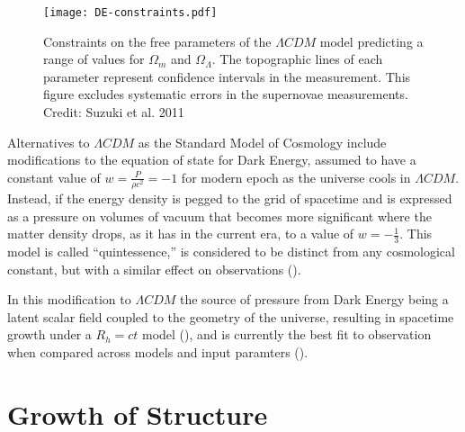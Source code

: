 \documentclass{paper}
\begin{document}
  \begin{figure}[!htb]
    \begin{centering}
    \texttt{[image: DE-constraints.pdf]}
    \caption{Constraints on the free parameters of the \(\Lambda CDM\)
      model predicting a range of values for \(\Omega_{m}\) and 
      \(\Omega_{\Lambda}\). The topographic lines of each parameter represent 
      confidence intervals in the measurement. This figure excludes systematic
      errors in the supernovae measurements.
    Credit: Suzuki et al. 2011}
    \label{fig:DE-constraints}
    \end{centering}
  \end{figure}

  Alternatives to \(\Lambda CDM\) as the Standard Model of Cosmology include
  modifications to the equation of state for Dark Energy, assumed to have a
  constant value of \(w = \frac{P}{\rho c^2} = -1\) for modern epoch as the
  universe cools in \(\Lambda CDM\). Instead, if the energy density is pegged
  to the grid of spacetime and is expressed as a pressure on volumes of
  vacuum that becomes more significant where the matter density drops, as it
  has in the current era, to a value of \(w = -\frac{1}{3}\). This model is 
  called ``quintessence,'' is considered to be distinct from any 
  cosmological constant, but with a similar effect on observations
  (\cite{PhysRevLett.80.1582}). %

  In this modification to \(\Lambda CDM\) the source of pressure from Dark 
  Energy being a latent scalar field coupled to the geometry of the universe, 
  resulting in spacetime growth under a \(R_h = ct\) model 
  (\cite{10.1093/mnras/stv3012}), and is currently the best fit to observation 
  when compared across models and input paramters 
  (\cite{10.1093/mnras/sty1962}).


\section{Growth of Structure}
\end{document}
